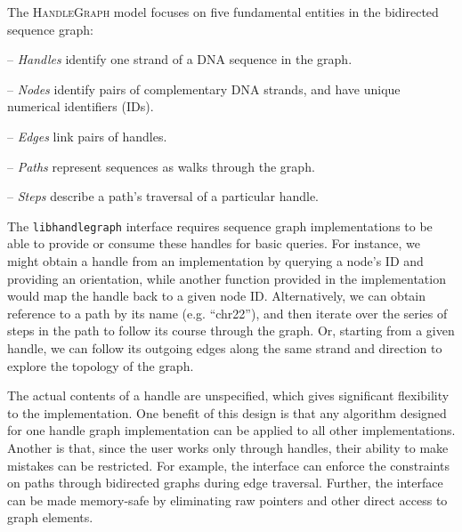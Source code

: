 \documentclass{article}
\begin{document}
The \textsc{HandleGraph} model focuses on five fundamental entities in the bidirected sequence graph:

-- \emph{Handles} identify one strand of a DNA sequence in the graph.

-- \emph{Nodes} identify pairs of complementary DNA strands, and have unique numerical identifiers (IDs).

-- \emph{Edges} link pairs of handles.

-- \emph{Paths} represent sequences as walks through the graph.

-- \emph{Steps} describe a path's traversal of a particular handle.


The \texttt{libhandlegraph} interface requires sequence graph implementations to be able to provide or consume these handles for basic queries.
For instance, we might obtain a handle from an implementation by querying a node's ID and providing an orientation, while another function provided in the implementation would map the handle back to a given node ID.
Alternatively, we can obtain reference to a path by its name (e.g. ``chr22''), and then iterate over the series of steps in the path to follow its course through the graph.
Or, starting from a given handle, we can follow its outgoing edges along the same strand and direction to explore the topology of the graph.


The actual contents of a handle are unspecified, which gives significant flexibility to the implementation.
One benefit of this design is that any algorithm designed for one handle graph implementation can be applied to all other implementations.
Another is that, since the user works only through handles, their ability to make mistakes can be restricted.
For example, the interface can enforce the constraints on paths through bidirected graphs during edge traversal.
Further, the interface can be made memory-safe by eliminating raw pointers and other direct access to graph elements.

\end{document}
